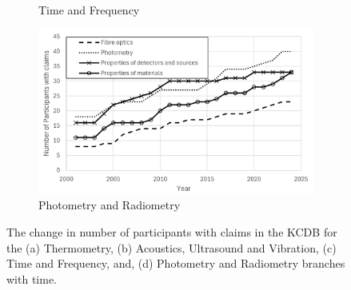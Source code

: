 \documentclass[
	a4paper, %
	10pt, %
	unnumberedsections, %
	twoside, %
]{LTJournalArticle}
\begin{document}
\begin{figure}
\begin{subfigure}[b]{0.48\textwidth}
    \caption{Time and Frequency}
    \label{fig:tf_vs_time}
\end{subfigure}
\hfill
\begin{subfigure}[b]{0.48\textwidth}
    \includegraphics[width=\textwidth]{figures/Participants_Photometry.png}
    \caption{Photometry and Radiometry}
    \label{fig:pr_vs_time}
\end{subfigure}

\caption{The change in number of participants with claims in the KCDB for the (a) Thermometry, (b) Acoustics, Ultrasound and Vibration, (c) Time and Frequency, and, (d) Photometry and Radiometry branches with time.}
\label{fig:Branch_growth_a}
\end{figure}
\end{document}
